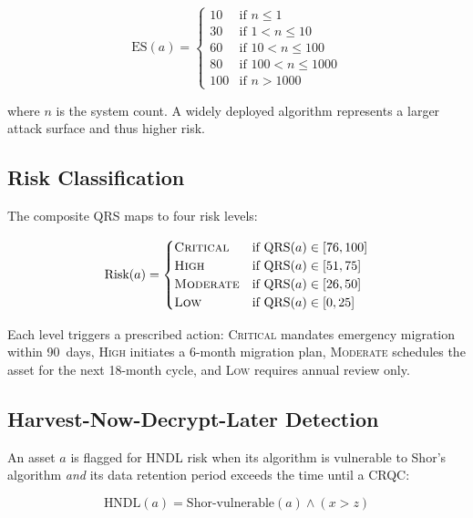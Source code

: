 \documentclass[conference,10pt]{IEEEtran}
\newcommand{\qrs}{\textrm{QRS}}
\newcommand{\es}{\textrm{ES}}
\begin{document}
\begin{equation}\label{eq:es}
  \es(a) =
  \begin{cases}
    10  & \text{if } n \leq 1 \\
    30  & \text{if } 1 < n \leq 10 \\
    60  & \text{if } 10 < n \leq 100 \\
    80  & \text{if } 100 < n \leq 1000 \\
    100 & \text{if } n > 1000
  \end{cases}
\end{equation}

\noindent where $n$ is the system count. A widely deployed algorithm
represents a larger attack surface and thus higher risk.

\subsection{Risk Classification}

The composite QRS maps to four risk levels:

\begin{equation}\label{eq:risk-levels}
  \text{Risk}(a) =
  \begin{cases}
    \textsc{Critical} & \text{if } \qrs(a) \in [76, 100] \\
    \textsc{High}     & \text{if } \qrs(a) \in [51, 75] \\
    \textsc{Moderate} & \text{if } \qrs(a) \in [26, 50] \\
    \textsc{Low}      & \text{if } \qrs(a) \in [0, 25]
  \end{cases}
\end{equation}

Each level triggers a prescribed action: \textsc{Critical} mandates
emergency migration within 90~days, \textsc{High} initiates a 6-month
migration plan, \textsc{Moderate} schedules the asset for the next
18-month cycle, and \textsc{Low} requires annual review only.

\subsection{Harvest-Now-Decrypt-Later Detection}

An asset $a$ is flagged for HNDL risk when its algorithm is vulnerable
to Shor's algorithm \emph{and} its data retention period exceeds the
time until a CRQC:

\begin{equation}\label{eq:hndl}
  \text{HNDL}(a) = \text{Shor-vulnerable}(a) \wedge (x > z)
\end{equation}
\end{document}
